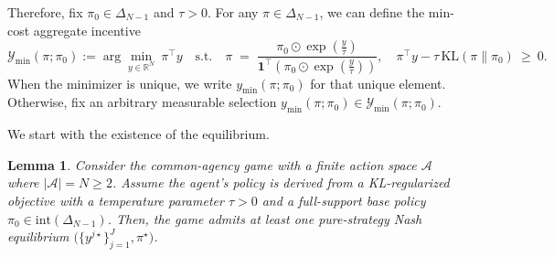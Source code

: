 \documentclass{article}
\newtheorem{lemma}{Lemma}
\begin{document}
Therefore, fix $\pi_0\in\Delta_{N-1}$ and $\tau>0$.
For any $\pi\in\Delta_{N-1}$, we can define the min-cost aggregate incentive
\[
\mathcal{Y}_{\min}(\pi;\pi_0)
:=\arg\min_{y\in\mathbb{R}^N}\ \pi^\top y
\quad\text{s.t.}\quad
\pi \;=\; \frac{\pi_0\odot \exp\!\left(\tfrac{y}{\tau}\right)}
{\mathbf{1}^\top\!\left(\pi_0\odot \exp\!\left(\tfrac{y}{\tau}\right)\right)},
\quad
\pi^\top y-\tau\,\mathrm{KL}(\pi\|\pi_0)\ \ge\ 0.
\]
When the minimizer is unique, we write $y_{\min}(\pi;\pi_0)$ for that unique element.
Otherwise, fix an arbitrary measurable selection $y_{\min}(\pi;\pi_0)\in\mathcal{Y}_{\min}(\pi;\pi_0)$.

We start with the existence of the equilibrium.
\begin{lemma}
\label{lem:existence}
Consider the common-agency game with a finite action space $\mathcal{A}$ where $|\mathcal{A}| = N \ge 2$. Assume the agent's policy is derived from a KL-regularized objective with a temperature parameter $\tau > 0$ and a full-support base policy $\pi_0 \in \mathrm{int}(\Delta_{N-1})$. Then, the game admits at least one pure-strategy Nash equilibrium $\big(\{y^{j\star}\}_{j=1}^J, \pi^\star\big)$.
\end{lemma}
\end{document}

